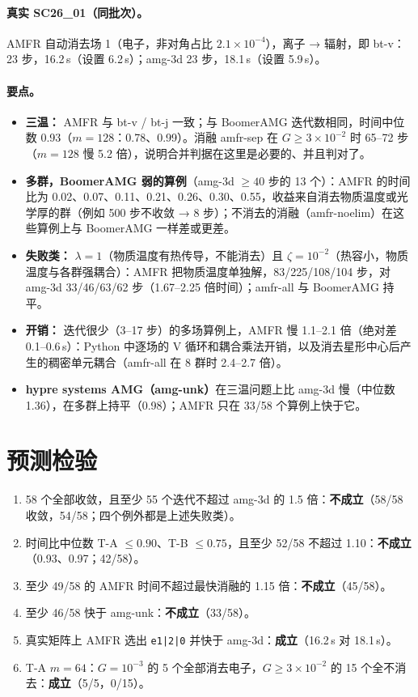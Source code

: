 \documentclass[11pt,a4paper]{ctexart}
\begin{document}
\paragraph{真实 SC26\_01（同批次）。} AMFR 自动消去场 1（电子，非对角占比 $2.1\times10^{-4}$），离子 → 辐射，即 bt-v：23 步，16.2\,s（设置 6.2\,s）；amg-3d 23 步，18.1\,s（设置 5.9\,s）。

\paragraph{要点。}
\begin{itemize}
\item \textbf{三温：} AMFR 与 bt-v / bt-j 一致；与 BoomerAMG 迭代数相同，时间中位数 0.93（$m=128$：0.78、0.99）。消融 amfr-sep 在 $G\ge3\times10^{-2}$ 时 65--72 步（$m=128$ 慢 5.2 倍），说明合并判据在这里是必要的、并且判对了。
\item \textbf{多群，BoomerAMG 弱的算例}（amg-3d $\ge40$ 步的 13 个）：AMFR 的时间比为 0.02、0.07、0.11、0.21、0.26、0.30、0.55，收益来自消去物质温度或光学厚的群（例如 500 步不收敛 → 8 步）；不消去的消融（amfr-noelim）在这些算例上与 BoomerAMG 一样差或更差。
\item \textbf{失败类：} $\lambda=1$（物质温度有热传导，不能消去）且 $\zeta=10^{-2}$（热容小，物质温度与各群强耦合）：AMFR 把物质温度单独解，83/225/108/104 步，对 amg-3d 33/46/63/62 步（1.67--2.25 倍时间）；amfr-all 与 BoomerAMG 持平。
\item \textbf{开销：} 迭代很少（3--17 步）的多场算例上，AMFR 慢 1.1--2.1 倍（绝对差 0.1--0.6\,s）：Python 中逐场的 V 循环和耦合乘法开销，以及消去星形中心后产生的稠密单元耦合（amfr-all 在 8 群时 2.4--2.7 倍）。
\item \textbf{hypre systems AMG（amg-unk）}在三温问题上比 amg-3d 慢（中位数 1.36），在多群上持平（0.98）；AMFR 只在 33/58 个算例上快于它。
\end{itemize}

\section{预测检验}
\begin{enumerate}
\item 58 个全部收敛，且至少 55 个迭代不超过 amg-3d 的 1.5 倍：\textbf{不成立}（58/58 收敛，54/58；四个例外都是上述失败类）。
\item 时间比中位数 T-A $\le0.90$、T-B $\le0.75$，且至少 52/58 不超过 1.10：\textbf{不成立}（0.93、0.97；42/58）。
\item 至少 49/58 的 AMFR 时间不超过最快消融的 1.15 倍：\textbf{不成立}（45/58）。
\item 至少 46/58 快于 amg-unk：\textbf{不成立}（33/58）。
\item 真实矩阵上 AMFR 选出 \texttt{e1|2|0} 并快于 amg-3d：\textbf{成立}（16.2\,s 对 18.1\,s）。
\item T-A $m=64$：$G=10^{-3}$ 的 5 个全部消去电子，$G\ge3\times10^{-2}$ 的 15 个全不消去：\textbf{成立}（5/5，0/15）。
\end{enumerate}
\end{document}
